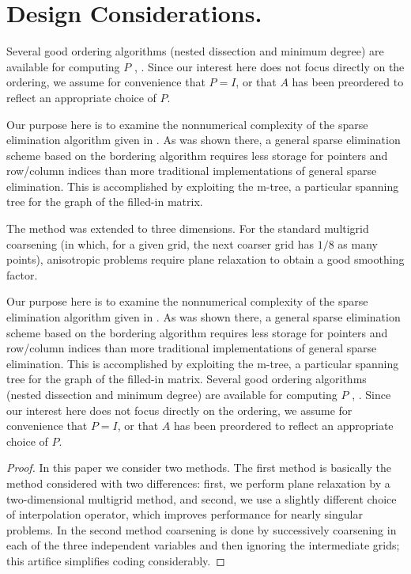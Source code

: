 \documentclass[twoside,leqno,twocolumn]{article}
\begin{document}
\section{Design Considerations.}Several good ordering algorithms (nested dissection and
minimum degree)
are available for computing $P$  \cite{GEORGELIU}, \cite{ROSE72}.
Since our interest here does not
focus directly on the ordering, we assume for convenience that $P=I$,
or that $A$ has been preordered to reflect an appropriate choice of $P$.

Our purpose here is to examine the nonnumerical complexity of the
sparse elimination algorithm given in  \cite{BANKSMITH}.
As was shown there, a general sparse elimination scheme based on the
bordering algorithm requires less storage for pointers and
row/column indices than more traditional implementations of general
sparse elimination.  This is accomplished by exploiting the m-tree,
a particular spanning tree for the graph of the filled-in matrix.

\begin{theorem} The method  was extended to three
dimensions. For the standard multigrid
coarsening
(in which, for a given grid, the next coarser grid has $1/8$
as many points), anisotropic problems require plane
relaxation to
obtain a good smoothing factor.\end{theorem}

Our purpose here is to examine the nonnumerical complexity of the
sparse elimination algorithm given in  \cite{BANKSMITH}.
As was shown there, a general sparse elimination scheme based on the
bordering algorithm requires less storage for pointers and
row/column indices than more traditional implementations of general
sparse elimination.  This is accomplished by exploiting the m-tree,
a particular spanning tree for the graph of the filled-in matrix.
Several good ordering algorithms (nested dissection and minimum degree)
are available for computing $P$  \cite{GEORGELIU}, \cite{ROSE72}.
Since our interest here does not
focus directly on the ordering, we assume for convenience that $P=I$,
or that $A$ has been preordered to reflect an appropriate choice of $P$.

\begin{proof} In this paper we consider two methods. The first method
is
basically the method considered with two differences:
first, we perform plane relaxation by a two-dimensional
multigrid method, and second, we use a slightly different
choice of
interpolation operator, which improves performance
for nearly singular problems. In the second method coarsening
is done by successively coarsening in each of the three
independent variables and then ignoring the intermediate
grids; this artifice simplifies coding considerably.
\end{proof}
\end{document}
